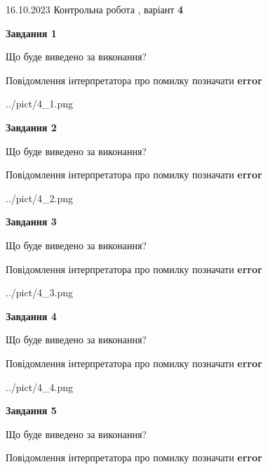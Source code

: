 \documentclass[12pt, ukrainian]{article}
\begin{document}
{\Large{16.10.2023 Контрольна робота , варіант  \No \textbf { 4 }\par}}
{
\begin {large}
{\begin {center}\textbf{Завдання 1}\end {center}}\par
Що буде виведено за виконання? \par
Повідомлення інтерпретатора про помилку позначати \textbf{error}

\begin{center}
	{../pict/4_1.png}
\end{center}
\newpage

{\begin {center}\textbf{Завдання 2}\end {center}}\par
Що буде виведено за виконання? \par
Повідомлення інтерпретатора про помилку позначати \textbf{error}

\begin{center}
	{../pict/4_2.png}
\end{center}
\newpage

{\begin {center}\textbf{Завдання 3}\end {center}}\par
Що буде виведено за виконання? \par
Повідомлення інтерпретатора про помилку позначати \textbf{error}

\begin{center}
	{../pict/4_3.png}
\end{center}
\newpage

{\begin {center}\textbf{Завдання 4}\end {center}}\par
Що буде виведено за виконання? \par
Повідомлення інтерпретатора про помилку позначати \textbf{error}

\begin{center}
	{../pict/4_4.png}
\end{center}
\newpage

{\begin {center}\textbf{Завдання 5}\end {center}}\par
Що буде виведено за виконання? \par
Повідомлення інтерпретатора про помилку позначати \textbf{error}


\end{large}}
\end{document}
